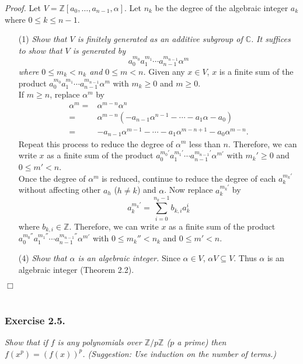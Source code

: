 \documentclass{article}
\begin{document}
\emph{Proof.}
Let $V = \mathbb{Z}[a_0, \ldots, a_{n-1}, \alpha]$.
Let $n_k$ be the degree of the algebraic integer $a_k$ where $0 \leq k \leq n-1$.
\begin{enumerate}
\item[(1)]
\emph{Show that $V$ is finitely generated as an additive subgroup of $\mathbb{C}$.}
\emph{It suffices to show that $V$ is generated by
$$a_0^{m_0} a_1^{m_1} \cdots a_{n-1}^{m_{n-1}} \alpha^m$$
where $0 \leq m_k < n_k$ and $0 \leq m < n$.}
Given any $x \in V$,
$x$ is a finite sum of the product
$a_0^{m_0} a_1^{m_1} \cdots a_{n-1}^{m_{n-1}} \alpha^m$
with $m_k \geq 0$ and $m \geq 0$. \\

If $m \geq n$,
replace $\alpha^m$
by
\begin{align*}
\alpha^m
=& \alpha^{m-n} \alpha^{n} \\
=& \alpha^{m-n} (-a_{n-1} \alpha^{n-1} - \cdots - a_1 \alpha - a_0) \\
=& -a_{n-1} \alpha^{m-1} - \cdots - a_1 \alpha^{m-n+1} - a_0 \alpha^{m-n}.
\end{align*}
Repeat this process to reduce the degree of $\alpha^m$ less than $n$.
Therefore, we can write $x$ as a finite sum of the product
$a_0^{m_0'} a_1^{m_1'} \cdots a_{n-1}^{m_{n-1}'} \alpha^{m'}$
with $m_k' \geq 0$ and $0 \leq m' < n$. \\

Once the degree of $\alpha^m$ is reduced,
continue to reduce the degree of each $a_k^{m_k'}$
without affecting other $a_h$ ($h \neq k$) and $\alpha$.
Now replace $a_k^{m_k'}$
by
$$a_k^{m_k'} = \sum_{i = 0}^{n_k-1} b_{k,i} a_k^{i}$$
where $b_{k,i} \in \mathbb{Z}$.
Therefore, we can write $x$ as a finite sum of the product
$a_0^{m_0''} a_1^{m_1''} \cdots a_{n-1}^{m_{n-1}''} \alpha^{m'}$
with $0 \leq m_k'' < n_k$ and $0 \leq m' < n$.
\item[(4)]
\emph{Show that $\alpha$ is an algebraic integer.}
Since $\alpha \in V$, $\alpha V \subseteq V$.
Thus $\alpha$ is an algebraic integer (Theorem 2.2).
\end{enumerate}
$\Box$ \\\\






\subsubsection*{Exercise 2.5.}
\emph{Show that if $f$ is any polynomials over $\mathbb{Z}/p\mathbb{Z}$ ($p$ a prime)
then $f(x^p) = (f(x))^p$.
(Suggestion: Use induction on the number of terms.)} \\
\end{document}
